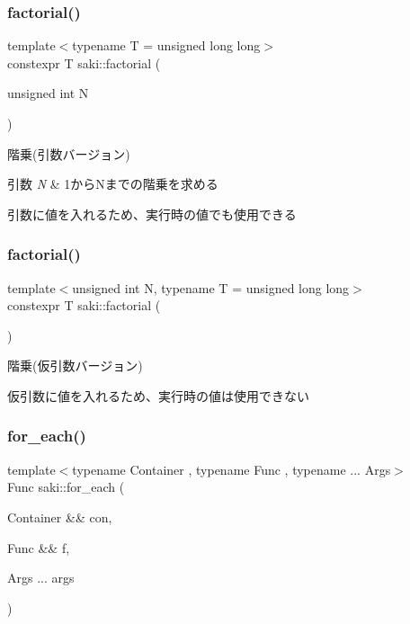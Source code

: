 \subsubsection{\texorpdfstring{factorial()}{factorial()}\hspace{0.1cm}{\footnotesize\ttfamily [1/2]}}
{\footnotesize\ttfamily template$<$typename T  = unsigned long long$>$ \\
constexpr T saki\+::factorial (\begin{DoxyParamCaption}\item[{unsigned int}]{N }\end{DoxyParamCaption})}



階乗(引数バージョン) 


\begin{DoxyParams}{引数}
{\em N} & 1から\+Nまでの階乗を求める\\
\hline
\end{DoxyParams}
引数に値を入れるため、実行時の値でも使用できる \mbox{\label{namespacesaki_a9dead910b791cee99cf82d1bd2a5d90c}} 
\subsubsection{\texorpdfstring{factorial()}{factorial()}\hspace{0.1cm}{\footnotesize\ttfamily [2/2]}}
{\footnotesize\ttfamily template$<$unsigned int N, typename T  = unsigned long long$>$ \\
constexpr T saki\+::factorial (\begin{DoxyParamCaption}{ }\end{DoxyParamCaption})}



階乗(仮引数バージョン) 

仮引数に値を入れるため、実行時の値は使用できない \mbox{\label{namespacesaki_a0b9cd605250f265e3e827406d8f3232d}} 
\subsubsection{\texorpdfstring{for\+\_\+each()}{for\_each()}}
{\footnotesize\ttfamily template$<$typename Container , typename Func , typename ... Args$>$ \\
Func saki\+::for\+\_\+each (\begin{DoxyParamCaption}\item[{Container \&\&}]{con,  }\item[{Func \&\&}]{f,  }\item[{Args ...}]{args }\end{DoxyParamCaption})}




